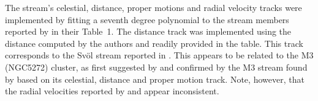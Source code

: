 The stream's celestial, distance, proper motions and radial velocity tracks were implemented by fitting a seventh degree polynomial to the stream members reported by \citet{Ibata2021} in their Table~1. The distance track was implemented using the distance computed by the authors and readily provided in the table. This track corresponds to the Sv\"ol stream reported in \citet{Ibata2021}. This appears to be related to the M3 (NGC5272) cluster, as first suggested by \citet{Bonaca2021} and confirmed by the M3 stream found by \citet{Yang2023} based on its celestial, distance and proper motion track. Note, however, that the radial velocities reported by \citet{Yang2023} and \citet{Ibata2021} appear inconsistent.
